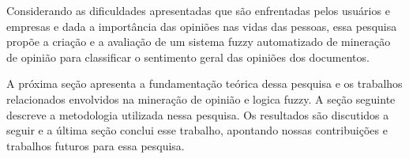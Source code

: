 \documentclass[template.tex]{subfiles}
\begin{document}
Considerando as dificuldades apresentadas que são enfrentadas pelos usuários e empresas e dada a importância das opiniões nas vidas das pessoas, essa pesquisa propõe a criação e a avaliação de um sistema fuzzy automatizado de mineração de opinião para classificar o sentimento geral das opiniões dos documentos. 

A próxima seção apresenta a fundamentação teórica dessa pesquisa e os trabalhos relacionados envolvidos na mineração de opinião e logica fuzzy. A seção seguinte descreve a metodologia utilizada nessa pesquisa. Os resultados são discutidos a seguir e a última seção conclui esse trabalho, apontando nossas contribuições e trabalhos futuros para essa pesquisa.

\end{document}
